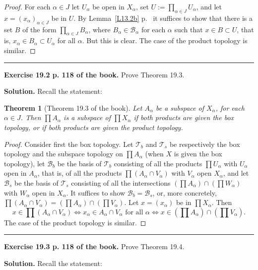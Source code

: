 \documentclass[12pt,letterpaper]{article}
\newtheorem{thm}{Theorem}%
\newcommand{\B}{\mathcal B}
\newcommand{\mc}{\mathcal}
\newcommand{\noi}{\noindent}%
\newcommand{\T}{\mathcal T}
\begin{document}
\begin{proof} 
For each $\alpha\in J$ let $U_\alpha$ be open in $X_\alpha$, set $U:=\prod_{\alpha\in J}U_{\alpha}$, and let $x=(x_\alpha)_{\alpha\in J}$ be in $U$. By Lemma~\ref{L13.2b} p.~\pageref{L13.2b} it suffices to show that there is a set $B$ of the form $\prod_{\alpha\in J}B_\alpha$, where $B_\alpha\in\mc B_\alpha$ for each $\alpha$ such that $x\in B\subset U$, that is, $x_\alpha\in B_\alpha\subset U_\alpha$ for all $\alpha$. But this is clear. The case of the product topology is similar. 
\end{proof} 

\bigskip\hrule\medskip 

\noi\textbf{Exercise 19.2 p. 118 of the book.} Prove Theorem 19.3. 

\noi\textbf{Solution.} Recall the statement: 

\begin{thm}[Theorem 19.3 of the book]
Let $A_\alpha$ be a subspace of $X_\alpha$, for each $\alpha\in J$. Then $\prod A_\alpha$ is a subspace of $\prod X_\alpha$ if both products are given the box topology, or if both products are given the product topology.
\end{thm} 

\begin{proof} 
Consider first the box topology. %
Let $\T_b$ and $\T_s$ be respectively the box topology and the subspace topology on $\prod A_\alpha$ (when $X$ is given the box topology), let $\B_b$ be the basis of $\T_b$ consisting of all the products $\prod U_\alpha$ with $U_\alpha$ open in $A_\alpha$, that is, of all the products $\prod(A_\alpha\cap V_\alpha)$ with $V_\alpha$ open $X_\alpha$, and let $\B_s$ be the basis of $\T_s$ consisting of all the intersections $(\prod A_\alpha)\cap(\prod W_\alpha)$ with $W_\alpha$ open in $X_\alpha$. It suffices to show $\B_b=\B_s$, or, more concretely, $\prod(A_\alpha\cap V_\alpha)=(\prod A_\alpha)\cap(\prod V_\alpha)$. Let $x=(x_\alpha)$ be in $\prod X_\alpha$. Then 
$$
x\in\prod(A_\alpha\cap V_\alpha)\iff x_\alpha\in A_\alpha\cap V_\alpha\text{ for all }\alpha\iff x\in(\prod A_\alpha)\cap(\prod V_\alpha).
$$ 
The case of the product topology is similar. 
\end{proof} 

\smallskip\hrule\medskip 

\noi\textbf{Exercise 19.3 p. 118 of the book.} Prove Theorem 19.4. 

\noi\textbf{Solution.} Recall the statement: 
\end{document}
